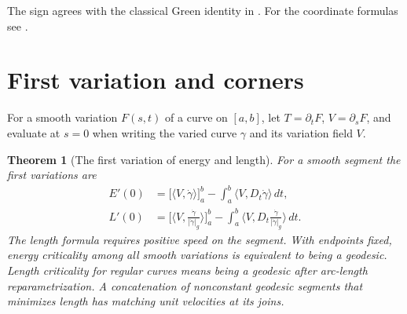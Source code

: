 \documentclass[11pt,oneside,openany]{book}
\theoremstyle{plain}
\newtheorem{theorem}{Theorem}[chapter]
\theoremstyle{definition}
\theoremstyle{remark}
\begin{document}
The sign agrees with the classical Green identity in \cite{P201}.
For the coordinate formulas see \cite[Chapters 2 and 5]{LeeRM}.

\section{First variation and corners}\label{p202:G10}

For a smooth variation \(F(s,t)\) of a curve on \([a,b]\), let
\(T=\partial_tF\), \(V=\partial_sF\), and evaluate at \(s=0\) when
writing the varied curve \(\gamma\) and its variation field \(V\).

\begin{theorem}[The first variation of energy and length]
\label{thm:p202-first-variation}
For a smooth segment the first variations are
\begin{align*}
 E'(0)&=\bigl[\langle V,\dot\gamma\rangle\bigr]_a^b
                  -\int_a^b\langle V,D_t\dot\gamma\rangle\,dt,\\
 L'(0)&=\biggl[\biggl\langle V,\frac{\dot\gamma}{\lvert\dot\gamma\rvert_g}
                         \biggr\rangle\biggr]_a^b
          -\int_a^b\biggl\langle V,
                   D_t\frac{\dot\gamma}{\lvert\dot\gamma\rvert_g}
                           \biggr\rangle\,dt .
\end{align*}
The length formula requires positive speed on the segment.
With endpoints fixed, energy criticality among all smooth
variations is equivalent to being a geodesic. Length criticality
for regular curves means being a geodesic after arc-length
reparametrization. A concatenation of nonconstant geodesic
segments that minimizes length has matching unit velocities at
its joins.
\end{theorem}
\end{document}
